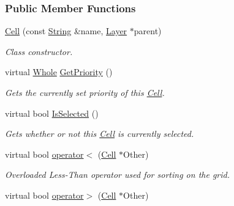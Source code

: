\subsubsection*{Public Member Functions}
\begin{DoxyCompactItemize}
\item 
\hypertarget{classMezzanine_1_1UI_1_1Cell_a381ad8447e3d46296a3caee3963648f0}{
\hyperlink{classMezzanine_1_1UI_1_1Cell_a381ad8447e3d46296a3caee3963648f0}{Cell} (const \hyperlink{namespaceMezzanine_acf9fcc130e6ebf08e3d8491aebcf1c86}{String} \&name, \hyperlink{classMezzanine_1_1UI_1_1Layer}{Layer} $\ast$parent)}
\label{classMezzanine_1_1UI_1_1Cell_a381ad8447e3d46296a3caee3963648f0}

\begin{DoxyCompactList}\small\item\em Class constructor. \item\end{DoxyCompactList}\item 
virtual \hyperlink{namespaceMezzanine_adcbb6ce6d1eb4379d109e51171e2e493}{Whole} \hyperlink{classMezzanine_1_1UI_1_1Cell_a6e45a4910d845723cd7ce136efc69fdf}{GetPriority} ()
\begin{DoxyCompactList}\small\item\em Gets the currently set priority of this \hyperlink{classMezzanine_1_1UI_1_1Cell}{Cell}. \item\end{DoxyCompactList}\item 
virtual bool \hyperlink{classMezzanine_1_1UI_1_1Cell_abc3d1123a50e1331974ef857876a0572}{IsSelected} ()
\begin{DoxyCompactList}\small\item\em Gets whether or not this \hyperlink{classMezzanine_1_1UI_1_1Cell}{Cell} is currently selected. \item\end{DoxyCompactList}\item 
virtual bool \hyperlink{classMezzanine_1_1UI_1_1Cell_a178dda3621c1489b7b958c35a4dedf15}{operator$<$} (\hyperlink{classMezzanine_1_1UI_1_1Cell}{Cell} $\ast$Other)
\begin{DoxyCompactList}\small\item\em Overloaded Less-\/Than operator used for sorting on the grid. \item\end{DoxyCompactList}\item 
virtual bool \hyperlink{classMezzanine_1_1UI_1_1Cell_aa3232348bada9f540df323c34f513784}{operator$>$} (\hyperlink{classMezzanine_1_1UI_1_1Cell}{Cell} $\ast$Other)

\end{DoxyCompactItemize}
